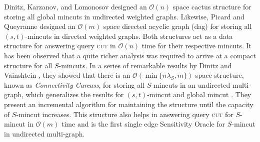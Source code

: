 \documentclass[letterpaper,11pt]{article}
\begin{document}
\noindent
Dinitz, Karzanov, and Lomonosov \cite{dinitz1976structure} designed an ${\mathcal O}(n)$ space cactus structure for storing all global mincuts in undirected weighted graphs. Likewise, Picard and Queyranne \cite{DBLP:journals/mp/PicardQ80} designed an ${\mathcal O}(m)$ space directed acyclic graph (dag) for storing all $(s,t)$-mincuts in directed weighted graphs. Both structures act as a data structure for answering query \textsc{cut} in ${\mathcal O}(n)$ time for their respective mincuts. 
It has been observed that a quite richer analysis was required to arrive at a compact structure for all $S$-mincuts. In a series of remarkable results by Dinitz and Vainshtein \cite{DBLP:conf/stoc/DinitzV94, DBLP:conf/soda/DinitzV95, DBLP:journals/siamcomp/DinitzV00}, they showed that there is an ${\mathcal O}(\min\{n\lambda_S,m\})$ space structure, known as \textit{Connectivity Carcass}, for storing all $S$-mincuts in an undirected multi-graph, which generalizes the results for $(s,t)$-mincut \cite{DBLP:journals/mp/PicardQ80} and global mincut \cite{dinitz1976structure}. They present an incremental algorithm for maintaining the structure until the capacity of $S$-mincut increases. This structure also helps in answering query \textsc{cut} for $S$-mincut in ${\mathcal O}(m)$ time and is the first single edge Sensitivity Oracle for $S$-mincut in undirected multi-graph. 
\end{document}
